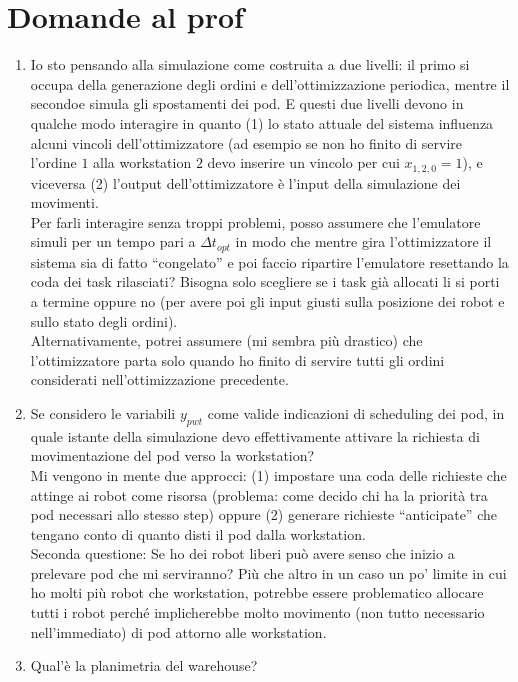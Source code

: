 \section{Domande al prof}
\begin{enumerate}
    \item Io sto pensando alla simulazione come costruita a due livelli: il primo  si occupa della generazione degli ordini e dell'ottimizzazione periodica, mentre il secondoe simula gli spostamenti dei pod. E questi due livelli devono in qualche modo interagire in quanto (1) lo stato attuale del sistema influenza alcuni vincoli dell'ottimizzatore (ad esempio se non ho finito di servire l'ordine $1$ alla workstation $2$ devo inserire un vincolo per cui $x_{1,2,0} = 1$), e viceversa (2) l'output dell'ottimizzatore è l'input della simulazione dei movimenti. \\
    Per farli interagire senza troppi problemi, posso assumere che l'emulatore simuli per un tempo pari a $\Delta t_{opt}$ in modo che mentre gira l'ottimizzatore il sistema sia di fatto \enquote{congelato} e poi faccio ripartire l'emulatore resettando la coda dei task rilasciati? Bisogna solo scegliere se i task già allocati li si porti a termine oppure no (per avere poi gli input giusti sulla posizione dei robot e sullo stato degli ordini). \\
    Alternativamente, potrei assumere (mi sembra più drastico) che l'ottimizzatore parta solo quando ho finito di servire tutti gli ordini considerati nell'ottimizzazione precedente.

    \item Se considero le variabili $y_{pwt}$ come valide indicazioni di scheduling dei pod, in quale istante della simulazione devo effettivamente attivare la richiesta di movimentazione del pod verso la workstation? \\
    Mi vengono in mente due approcci: (1) impostare una coda delle richieste che attinge ai robot come risorsa (problema: come decido chi ha la priorità tra pod necessari allo stesso step) oppure (2) generare richieste \enquote{anticipate} che tengano conto di quanto disti il pod dalla workstation. \\
    Seconda questione: Se ho dei robot liberi può avere senso che inizio a prelevare pod che mi serviranno? Più che altro in un caso un po' limite in cui ho molti più robot che workstation, potrebbe essere problematico allocare tutti i robot perché implicherebbe molto movimento (non tutto necessario nell'immediato) di pod attorno alle workstation.

    \item Qual'è la planimetria del warehouse?
    


\end{enumerate}


